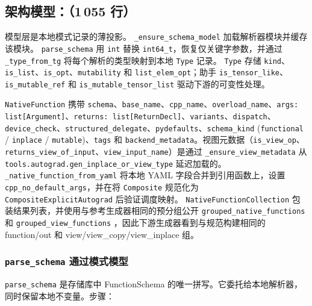 \subsection{架构模型：（1\,055 行）}

模型层是本地模式记录的薄投影。 \texttt{\_ensure\_schema\_model} 加载解析器模块并缓存该模块。 \texttt{parse\_schema} 用 \texttt{int} 替换 \texttt{int64\_t}，恢复仅关键字参数，并通过 \texttt{\_type\_from\_tg} 将每个解析的类型映射到本地 \texttt{Type} 记录。 \texttt{Type} 存储 \texttt{kind}、\texttt{is\_list}、\texttt{is\_opt}、\texttt{mutability} 和 \texttt{list\_elem\_opt}；助手 \texttt{is\_tensor\_like}、\texttt{is\_mutable\_ref} 和 \texttt{is\_mutable\_tensor\_list} 驱动下游的可变性处理。

\texttt{NativeFunction} 携带 \texttt{schema}、\texttt{base\_name}、\texttt{cpp\_name}、\texttt{overload\_name}、\texttt{args: list[Argument]}、\texttt{returns: list[ReturnDecl]}、\texttt{variants}、\texttt{dispatch}、\texttt{device\_check}、\texttt{structured\_delegate}、\texttt{pydefaults}、\texttt{schema\_kind} (\texttt{functional} / \texttt{inplace} / \texttt{mutable})、\texttt{tags} 和 \texttt{backend\_metadata}。视图元数据（\texttt{is\_view\_op}、\texttt{returns\_view\_of\_input}、\texttt{view\_input\_name}）是通过 \texttt{\_ensure\_view\_metadata} 从 \texttt{tools.autograd.gen\_inplace\_or\_view\_type} 延迟加载的。 \texttt{\_native\_function\_from\_yaml} 将本地 YAML 字段合并到引用函数上，设置 \texttt{cpp\_no\_default\_args}，并在将 \texttt{Composite} 规范化为 \texttt{CompositeExplicitAutograd} 后验证调度映射。 \texttt{NativeFunctionCollection} 包装结果列表，并使用与参考生成器相同的预分组公开 \texttt{grouped\_native\_functions} 和 \texttt{grouped\_view\_functions} ，因此下游生成器看到与规范构建相同的 function/out 和 view/view\_copy/view\_inplace 组。

\subsubsection{\texttt{parse\_schema} 通过模式模型}

\texttt{parse\_schema} 是存储库中 FunctionSchema 的唯一拼写。它委托给本地解析器，同时保留本地不变量。步骤：

